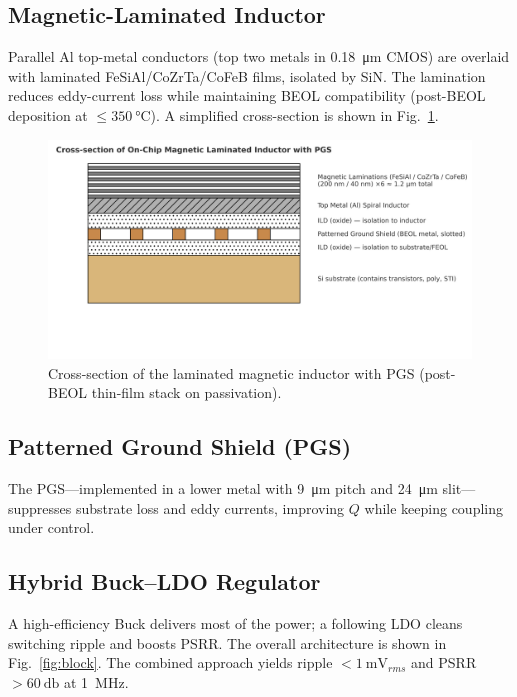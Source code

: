 \documentclass[journal]{IEEEtran}
\begin{document}
\subsection{Magnetic-Laminated Inductor}
Parallel Al top-metal conductors (top two metals in \SI{0.18}{\um} CMOS) are overlaid with laminated FeSiAl/CoZrTa/CoFeB films, isolated by SiN. The lamination reduces eddy-current loss while maintaining BEOL compatibility (post-BEOL deposition at $\le\SI{350}{\celsius}$). A simplified cross-section is shown in Fig.~\ref{fig:cross}.

\begin{figure}[t]
  \centering
  \includegraphics[width=.85\textwidth]{fig/fig1_laminated_cross_section.png}%
  \vspace{-4pt}
  \caption{Cross-section of the laminated magnetic inductor with PGS (post-BEOL thin-film stack on passivation).}
  \label{fig:cross}
  \vspace{-6pt}
\end{figure}

\subsection{Patterned Ground Shield (PGS)}
The PGS---implemented in a lower metal with \SI{9}{\um} pitch and \SI{24}{\um} slit---suppresses substrate loss and eddy currents, improving $Q$ while keeping coupling under control.

\subsection{Hybrid Buck--LDO Regulator}
A high-efficiency Buck delivers most of the power; a following LDO cleans switching ripple and boosts PSRR. The overall architecture is shown in Fig.~\ref{fig:block}. The combined approach yields ripple $<\SI{1}{\milli\volt_{rms}}$ and PSRR $>\SI{60}{\decibel}$ at \SI{1}{\mega\hertz}.
\end{document}
